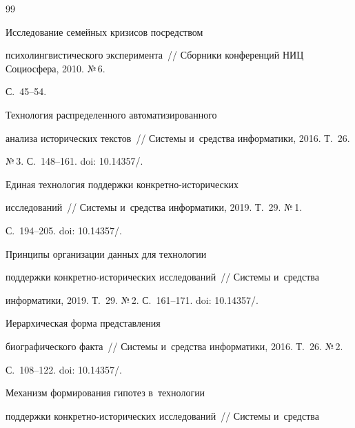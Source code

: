{\small\frenchspacing


{%




\begin{thebibliography}{99}




   Исследование семейных кризисов посредством 


психолингвистического эксперимента~/\!\!/ Сборники конференций НИЦ Социосфера, 2010. №\,6. 


С.~45--54.




   Технология распределенного автоматизированного 


анализа исторических текстов~/\!\!/ Сис\-те\-мы и~средства информатики, 2016. Т.~26. 


№\,3. С.~148--161. doi: 10.14357\!/.




   Единая технология поддержки кон\-крет\-но-ис\-то\-ри\-че\-ских 


  исследований~/\!\!/ Сис\-те\-мы и~средства информатики, 2019. Т.~29. №\,1. 


С.~194--205. doi: 10.14357\!/.




   Принципы организации данных для технологии 


поддержки кон\-крет\-но-ис\-то\-ри\-че\-ских исследований~/\!\!/ Сис\-те\-мы и~средства 


информатики, 2019. Т.~29. №\,2. С.~161--171. doi: 10.14357\!/.




   Иерархическая форма представления 


биографического факта~/\!\!/ Сис\-те\-мы и~средства информатики, 2016. Т.~26. №\,2. 


С.~108--122. doi: 10.14357\!/.




   Механизм формирования гипотез в~технологии 


поддержки конкретно-исторических исследований~/\!\!/ Сис\-те\-мы и~средства 



\end{thebibliography}}}
